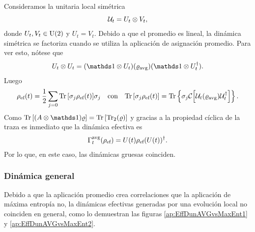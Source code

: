 Consideramos la unitaria local simétrica
\begin{equation}
    \mathcal{U}_{t}=U_{t}\otimes V_{t},\nonumber
\end{equation}
donde $U_{t},V_{t}\in\text{U}(2)$ y $U_{t}=V_{t}$. Debido a que el promedio es lineal, la dinámica simétrica se factoriza cuando se utiliza la aplicación de asignación promedio. Para ver esto, nótese que
\begin{equation}
  U_{t}\otimes U_{t}=(\Id\otimes U_{t})(\varrho_{\avg})(\Id\otimes U_{t}^{\dag}).\nonumber
\end{equation}
Luego
\begin{align}
  \rho_{\text{ef}}(t)=\frac{1}{2}\sum_{j=0}\Tr\qty[\sigma_{j}\rho_{\text{ef}}(t)]\sigma_{j} & & \text{con} & &\Tr\qty[\sigma_{j}\rho_{\text{ef}}(t)]=\Tr\left\{\sigma_{j}\mathcal{C}\qty[\mathcal{U}_{t} (\varrho_{\text{avg}}) \mathcal{U}_{t}^{\dagger}]\right\}.\nonumber
\end{align}
Como $\Tr\qty[(A\otimes \Id) \varrho]=\Tr\qty[ \Tr_{2}(\varrho)]$ y gracias a la propiedad cíclica de la traza es inmediato que la dinámica efectiva es
\begin{equation}
    \Gamma_{t}^{\text{avg}}(\rho_{\text{ef}})=U(t)\rho_{\text{ef}}(U(t))^{\dag}.\nonumber
\end{equation}
Por lo que, en este caso, las dinámicas gruesas coinciden.

\subsubsection{Dinámica general}

Debido a que la aplicación promedio crea correlaciones que la aplicación de máxima entropía no, la dinámicas efectivas generadas por una evolución local no coinciden en general, como lo demuestran las figuras \ref{ap:EffDunAVGvsMaxEnt1} y \ref{ap:EffDunAVGvsMaxEnt2}.

